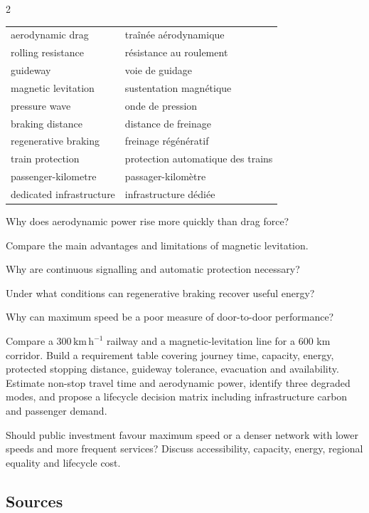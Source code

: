 \begin{multicols}{2}
\begin{vocabulary}
\begin{tabularx}{\linewidth}{@{}lX@{}}
aerodynamic drag & traînée aérodynamique\\
rolling resistance & résistance au roulement\\
guideway & voie de guidage\\
magnetic levitation & sustentation magnétique\\
pressure wave & onde de pression\\
braking distance & distance de freinage\\
regenerative braking & freinage régénératif\\
train protection & protection automatique des trains\\
passenger-kilometre & passager-kilomètre\\
dedicated infrastructure & infrastructure dédiée
\end{tabularx}
\end{vocabulary}

\begin{questions}
\item Why does aerodynamic power rise more quickly than drag force?
\item Compare the main advantages and limitations of magnetic levitation.
\item Why are continuous signalling and automatic protection necessary?
\item Under what conditions can regenerative braking recover useful energy?
\item Why can maximum speed be a poor measure of door-to-door performance?
\end{questions}

\begin{engineeringchallenge}
Compare a $300\,\mathrm{km\,h^{-1}}$ railway and a magnetic-levitation line for a 600 km corridor. Build a requirement
table covering journey time, capacity, energy, protected stopping distance, guideway tolerance, evacuation and
availability. Estimate non-stop travel time and aerodynamic power, identify three degraded modes, and propose a
lifecycle decision matrix including infrastructure carbon and passenger demand.
\end{engineeringchallenge}

\begin{speaking}
Should public investment favour maximum speed or a denser network with lower speeds and more frequent services?
Discuss accessibility, capacity, energy, regional equality and lifecycle cost.
\end{speaking}
\end{multicols}

\subsection*{Sources}
